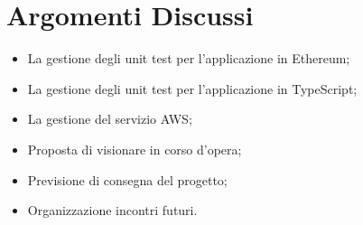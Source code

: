 \section{Argomenti Discussi}
	\begin{itemize}
		\item La gestione degli unit test per l'applicazione in Ethereum;
		\item La gestione degli unit test per l'applicazione in TypeScript;
		\item La gestione del servizio AWS;
		\item Proposta di visionare in corso d'opera;
		\item Previsione di consegna del progetto;
		\item Organizzazione incontri futuri.
	\end{itemize}
